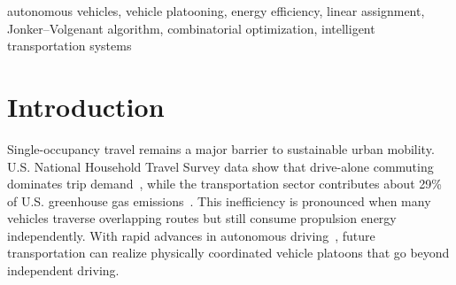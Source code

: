 \documentclass[conference]{IEEEtran}
\begin{document}
\begin{IEEEkeywords}
autonomous vehicles, vehicle platooning, energy efficiency, linear assignment, Jonker--Volgenant algorithm, combinatorial optimization, intelligent transportation systems
\end{IEEEkeywords}

\section{Introduction}

Single-occupancy travel remains a major barrier to sustainable urban mobility. U.S. National Household Travel Survey data show that drive-alone commuting dominates trip demand~\cite{usdot2024}, while the transportation sector contributes about 29\% of U.S. greenhouse gas emissions~\cite{epa2023}. This inefficiency is pronounced when many vehicles traverse overlapping routes but still consume propulsion energy independently. With rapid advances in autonomous driving~\cite{yurtsever2020survey}, future transportation can realize physically coordinated vehicle platoons that go beyond independent driving.
\end{document}
